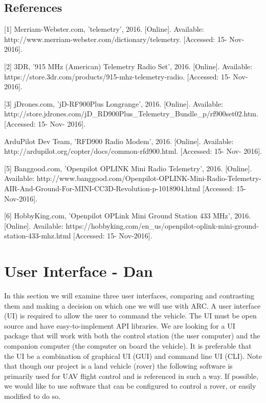 \documentclass[compsoc,draftclsnofoot,onecolumn,10pt]{IEEEtran}
\begin{document}
\subsection{References}

[1] Merriam-Webster.com, 'telemetry', 2016. [Online]. Available: http://www.merriam-webster.com/dictionary/telemetry. [Accessed: 15- Nov- 2016].\par

[2] 3DR, '915 MHz (American) Telemetry Radio Set', 2016. [Online]. Available: https://store.3dr.com/products/915-mhz-telemetry-radio. [Accessed: 15- Nov- 2016].\par

[3] jDrones.com, 'jD-RF900Plus Longrange', 2016. [Online]. Available: http://store.jdrones.com/jD\_RD900Plus\_Telemetry\_Bundle\_p/rf900set02.htm. [Accessed: 15- Nov- 2016].\par
[4] ArduPilot Dev Team, 'RFD900 Radio Modem', 2016. [Online]. Available: http://ardupilot.org/copter/docs/common-rfd900.html. [Accessed: 15- Nov- 2016].\par

[5] Banggood.com, 'Openpilot OPLINK Mini Radio Telemetry', 2016. [Online].
Available: http://www.banggood.com/Openpilot-OPLINK-Mini-Radio-Telemetry-AIR-And-Ground-For-MINI-CC3D-Revolution-p-1018904.html [Accessed: 15- Nov-2016].\par

[6] HobbyKing.com, 'Openpilot OPLink Mini Ground Station 433 MHz', 2016.  [Online]. Available: https://hobbyking.com/en\_us/openpilot-oplink-mini-ground-station-433-mhz.html [Accessed: 15- Nov-2016].\par

\newpage

\section{User Interface - Dan}
In this section we will examine three user interfaces, comparing and contrasting
them and making a decision on which one we will use with ARC.
A user interface (UI) is required to allow the user to command the vehicle. The
UI must be open source and have easy-to-implement API libraries. We are looking
for a UI package that will work with both the control station (the user
computer) and the companion computer (the computer on board the vehicle). It is
preferable that the UI be a combination of graphical UI (GUI) and command line
UI (CLI). Note that though our project is a land vehicle (rover) the following
software is primarily used for UAV flight control and is referenced in such a
way. If possible, we would like to use software that can be configured to
control a rover, or easily modified to do so.
\end{document}
